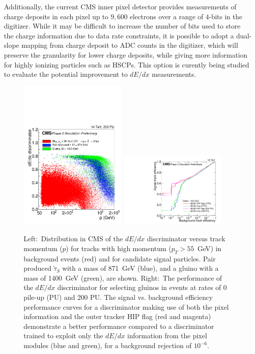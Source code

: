 Additionally, the current CMS inner pixel detector provides measurements of charge deposits in each pixel up to $9,600$ electrons over a range of $4$-bits in the digitizer. While it may be difficult to increase the number of bits used to store the charge information due to data rate constraints, it is possible to adopt a dual-slope mapping from charge deposit to ADC counts in the digitizer, which will preserve the granularity for lower charge deposits, while giving more information for highly ionizing particles such as HSCPs. This option is curently being studied to evaluate the potential improvement to $dE/dx$ measurements. 

\begin{figure}[t]
\begin{center}
  \includegraphics[width=0.47\textwidth]{figures/HSCP/TDR-17-001_fig6_26_a_HSCP_SpecialPlot_v2.pdf} \hfill
  \includegraphics[width=0.47\textwidth]{figures/HSCP/TDR-17-001_fig6_27_a_HSCP_Comparison_ROC_Gluino_M1400_NoPU_Super_v2.pdf}
  \caption{Left:~Distribution in CMS of the $dE/dx$ discriminator versus track momentum ($p$) for tracks with high momentum ($p_T > 55$~GeV) in background events (red) and for candidate signal particles. Pair produced $\tilde{\tau}_S$ with a mass of 871~GeV (blue), and a gluino with a mass of 1400~GeV (green), are shown. Right:~The performance of the $dE/dx$ discriminator for selecting gluinos in events at rates of 0 pile-up (PU) and 200 PU. The signal vs. background efficiency performance curves for a discriminator making use of both the pixel information and the outer tracker HIP flag (red and magenta) demonstrate a better performance compared to a discriminator trained to exploit only the $dE/dx$ information from the pixel modules (blue and green), for a background rejection of $10^{-6}$.}
  \label{fig:cmsupgrade_hscp}
\end{center}
\end{figure}

